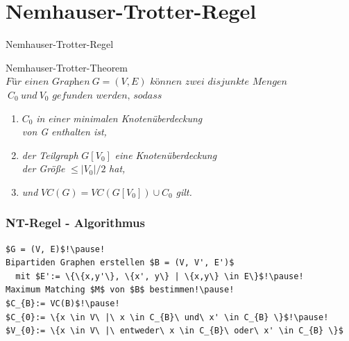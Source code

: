 \documentclass{beamer}
\begin{document}
\section{Nemhauser-Trotter-Regel}
	
\begin{frame}{Nemhauser-Trotter-Regel}
\begin{block}{Nemhauser-Trotter-Theorem}
$\textit{Für einen Graphen}\ G=(V,E)\textit{ können zwei disjunkte Mengen}$\\ $\ C_{0}\ und\ V_{0} \textit{ gefunden werden, sodass}$
\begin{enumerate}[<+->]
\item $C_{0}$ \textit{ in einer minimalen Knotenüberdeckung} \\ 
\textit{von G enthalten ist,}
\item \textit{der Teilgraph }$G[V_{0}]$ \textit{eine Knotenüberdeckung}\\
\textit{der Größe} $\leq |V_{0}| / 2$ \textit{ hat,}
\item \textit{und} $VC(G) = VC(G[V_{0}])\cup C_{0}$ \textit{ gilt.}
\end{enumerate}

\end{block}
\end{frame}
	
\begin{frame}[fragile]
\frametitle{NT-Regel - Algorithmus}
\begin{lstlisting}[mathescape = true, basicstyle=\ttfamily, escapechar = !]
$G = (V, E)$!\pause!
Bipartiden Graphen erstellen $B = (V, V', E')$
  mit $E':= \{\{x,y'\}, \{x', y\} | \{x,y\} \in E\}$!\pause!
Maximum Matching $M$ von $B$ bestimmen!\pause!
$C_{B}:= VC(B)$!\pause!
$C_{0}:= \{x \in V\ |\ x \in C_{B}\ und\ x' \in C_{B} \}$!\pause!
$V_{0}:= \{x \in V\ |\ entweder\ x \in C_{B}\ oder\ x' \in C_{B} \}$
\end{lstlisting}

\end{frame}
\end{document}
